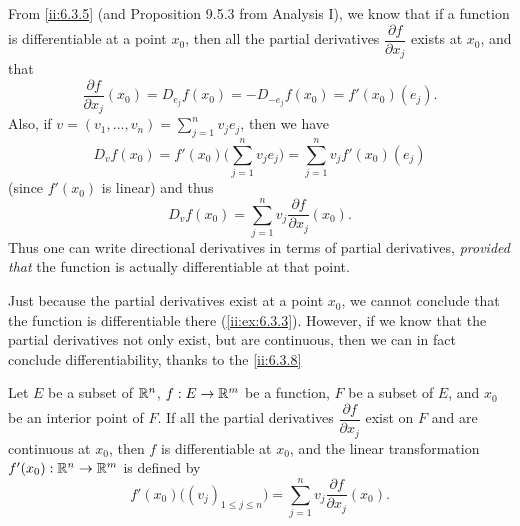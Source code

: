 \begin{ac}\label{ii:ac:6.3.2}
  From \cref{ii:6.3.5} (and Proposition 9.5.3 from Analysis I), we know that if a function is differentiable at a point \(x_0\), then all the partial derivatives \(\dfrac{\partial f}{\partial x_j}\) exists at \(x_0\), and that
  \[
    \dfrac{\partial f}{\partial x_j}(x_0) = D_{e_j} f(x_0) = - D_{-e_j} f(x_0) = f'(x_0)(e_j).
  \]
  Also, if \(v = (v_1, \dots, v_n) = \sum_{j = 1}^n v_j e_j\), then we have
  \[
    D_v f(x_0) = f'(x_0) \bigg(\sum_{j = 1}^n v_j e_j\bigg) = \sum_{j = 1}^n v_j f'(x_0)(e_j)
  \]
  (since \(f'(x_0)\) is linear) and thus
  \[
    D_v f(x_0) = \sum_{j = 1}^n v_j \dfrac{\partial f}{\partial x_j}(x_0).
  \]
  Thus one can write directional derivatives in terms of partial derivatives, \emph{provided that} the function is actually differentiable at that point.
\end{ac}

\begin{note}
  Just because the partial derivatives exist at a point \(x_0\), we cannot conclude that the function is differentiable there (\cref{ii:ex:6.3.3}).
  However, if we know that the partial derivatives not only exist, but are continuous, then we can in fact conclude differentiability, thanks to the \cref{ii:6.3.8}
\end{note}

\begin{thm}\label{ii:6.3.8}
  Let \(E\) be a subset of \(\mathbb{R}^n\), \(f : E \to \mathbb{R}^m\) be a function, \(F\) be a subset of \(E\), and \(x_0\) be an interior point of \(F\).
  If all the partial derivatives \(\dfrac{\partial f}{\partial x_j}\) exist on \(F\) and are continuous at \(x_0\), then \(f\) is differentiable at \(x_0\), and the linear transformation \(f'(x_0) : \mathbb{R}^n \to \mathbb{R}^m\) is defined by
  \[
    f'(x_0)\big((v_j)_{1 \leq j \leq n}\big) = \sum_{j = 1}^n v_j \dfrac{\partial f}{\partial x_j}(x_0).
  \]
\end{thm}

